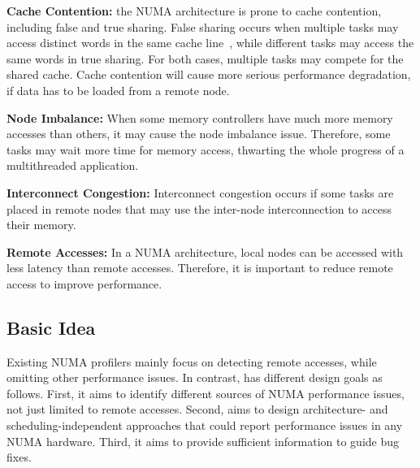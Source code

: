 \textbf{Cache Contention:} the NUMA architecture is prone to cache contention, including false and true sharing. False sharing occurs when multiple tasks may access distinct words in the same cache line~\cite{Hoard}, while different tasks may access the same words in true sharing. For both cases, multiple tasks may compete for the shared cache. Cache contention will cause more serious performance degradation, if data has to be loaded from a remote node. 
 
\textbf{Node Imbalance:} When some memory controllers have much more memory accesses than others, it may cause the node imbalance issue.
Therefore, some tasks may wait more time for memory access, thwarting the whole progress of a multithreaded application. 

\textbf{Interconnect Congestion:} Interconnect congestion occurs if some tasks are placed in remote nodes that may use the inter-node interconnection to access their memory. 

\textbf{Remote Accesses:} In a NUMA architecture, local nodes can be accessed with less latency than remote accesses. 
Therefore, it is important to reduce remote access to improve performance.


 
\subsection{Basic Idea}
\label{sec:idea}



Existing NUMA profilers mainly focus on detecting remote accesses, while omitting other performance issues. In contrast, \NP{} has different design goals as follows.  First, it aims to identify different sources of NUMA performance issues, not just limited to remote accesses. Second, \NP{} aims to design architecture- and scheduling-independent approaches that could report performance issues in any NUMA hardware. Third, it aims to provide sufficient information to guide bug fixes.  

